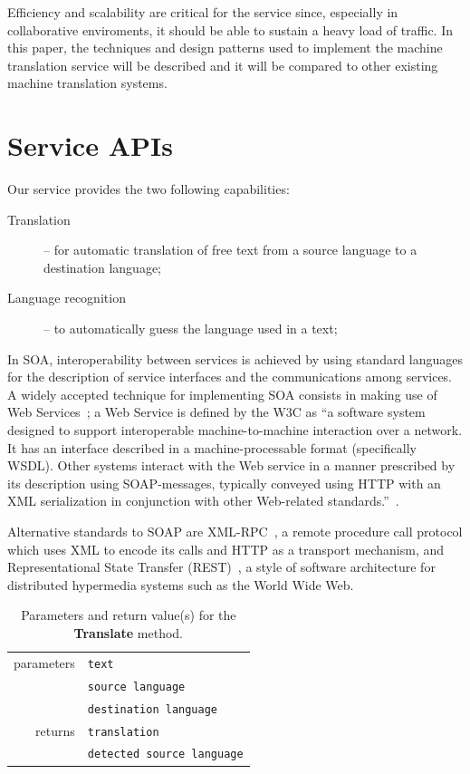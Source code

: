 \documentclass[11pt]{article}
\begin{document}
Efficiency and scalability are critical for the service since, especially in collaborative enviroments, it should be able to sustain a heavy load of traffic. In this paper, the techniques and design patterns used to implement the machine translation service will be described and it will be compared to other existing machine translation systems.

\section{Service APIs}

Our service provides the two following capabilities:

\begin{description}
  \item[Translation] -- for automatic translation of free text from a source language to a destination language;
  \item[Language recognition] -- to automatically guess the language used in a text;
\end{description}

In SOA, interoperability between services is achieved by using standard languages for the description of service interfaces and the communications among services. A widely accepted technique for implementing SOA consists in making use of Web Services~\citep{soa}; a Web  Service is defined by the W3C as ``a software system designed to support interoperable machine-to-machine interaction over a network. It has an interface described in a machine-processable format (specifically WSDL). Other systems interact with the Web service in a manner prescribed by its description using SOAP-messages, typically conveyed using HTTP with an XML serialization in conjunction with other Web-related standards.''~\citep{wsgloss}. 

Alternative standards to SOAP are XML-RPC~\citep{xmlrpcspec}, a remote procedure call protocol which uses XML to encode its calls and HTTP as a transport mechanism, and Representational State Transfer (REST)~\citep{rest}, a style of software architecture for distributed hypermedia systems such as the World Wide Web.

\begin{table}[!ht]
\begin{center}
 \begin{tabular}{|r|l|}
  \hline
   parameters	& {\tt\small text} \\ \cline{2-2}
   				& {\tt\small source language} \\ \cline{2-2}
   				& {\tt\small destination language} \\
  \hline \hline
   returns 	& {\tt\small translation} \\ \cline{2-2}
   			& {\tt\small detected source language} \\
  \hline
 \end{tabular}
\end{center}
\caption{Parameters and return value(s) for the {\bf Translate} method.}
\label{tab:translate}
\end{table}
\end{document}
